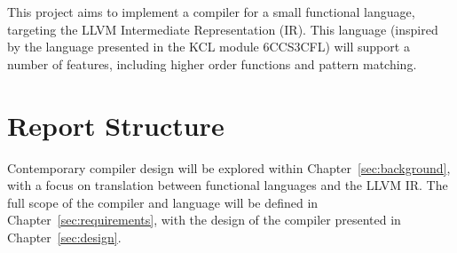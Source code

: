 This project aims to implement a compiler for a small functional language, targeting the LLVM
Intermediate Representation (IR). This language (inspired by the language presented in the KCL
module 6CCS3CFL) will support a number of features, including higher order functions and pattern
matching.

\section{Report Structure}

Contemporary compiler design will be explored within Chapter~\ref{sec:background}, with a focus on
translation between functional languages and the LLVM IR. The full scope of the compiler and
language will be defined in Chapter~\ref{sec:requirements}, with the design of the compiler
presented in Chapter~\ref{sec:design}.
